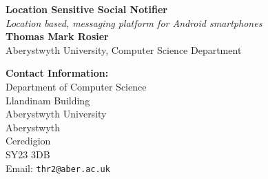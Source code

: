 \documentclass[a0,landscape]{a0poster}
\begin{document}


\begin{minipage}[b]{0.55\linewidth}
\veryHuge \color{DarkOrange} \textbf{Location Sensitive Social Notifier} \color{Black}\\ %
\Huge\textit{Location based, messaging platform for Android smartphones}\\[1cm] %
\huge \textbf{Thomas Mark Rosier}\\ %
\huge Aberystwyth University, Computer Science Department\\ %
\end{minipage}
%
\begin{minipage}[b]{0.25\linewidth}
\color{DarkSlateGray}\Large \textbf{Contact Information:}\\
Department of Computer Science\\
Llandinam Building\\
Aberystwyth University\\
Aberystwyth\\
Ceredigion\\
SY23 3DB\\ 
Email: \texttt{thr2@aber.ac.uk}\\ %
\end{minipage}
%
\end{document}
